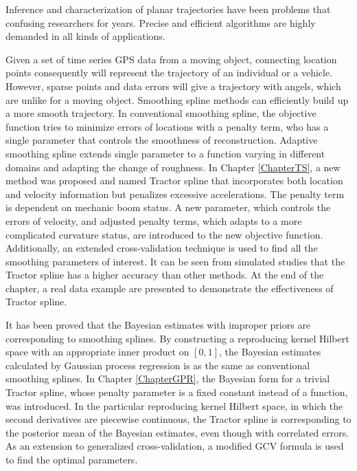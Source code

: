 
Inference and characterization of planar trajectories have been problems that confusing researchers for years. Precise and efficient algorithms are highly demanded in all kinds of applications. 

Given a set of time series GPS data from a moving object, connecting location points consequently will represent the trajectory of an individual or a vehicle. However, sparse points and data errors will give a trajectory with angels, which are unlike for a moving object. Smoothing spline methods can efficiently build up a more smooth trajectory. In conventional smoothing spline, the objective function tries to minimize errors of locations with a penalty term, who has a single parameter that controls the smoothness of reconstruction. Adaptive smoothing spline extends single parameter to a function varying in different domains and adapting the change of roughness. In Chapter \ref{ChapterTS}, a new method was proposed and named Tractor spline that incorporates both location and velocity information but penalizes excessive accelerations. The penalty term is dependent on mechanic boom status. A new parameter, which controls the errors of velocity, and adjusted penalty terms, which adapts to a more complicated curvature status, are introduced to the new objective function. Additionally, an extended cross-validation technique is used to find all the smoothing parameters of interest. It can be seen from simulated studies that the Tractor spline has a higher accuracy than other methods. At the end of the chapter, a real data example are presented to demonstrate the effectiveness of Tractor spline.


It has been proved that the Bayesian estimates with improper priors are corresponding to smoothing splines. By constructing a reproducing kernel Hilbert space with an appropriate inner product on $[0,1]$, the Bayesian estimates calculated by Gaussian process regression is as the same as conventional smoothing splines. In Chapter \ref{ChapterGPR}, the Bayesian form for a trivial Tractor spline, whose penalty parameter is a fixed constant instead of a function, was introduced. In the particular reproducing kernel Hilbert space, in which the second derivatives are piecewise continuous, the Tractor spline is corresponding to the posterior mean of the Bayesian estimates, even though with correlated errors. As an extension to generalized cross-validation, a modified GCV formula is used to find the optimal parameters. 


